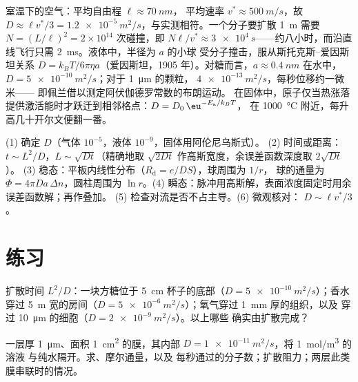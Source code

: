 \begin{example}[从分子到 $D$]\label{ex:b2:particle-diffusion:kinetic}
室温下的空气：平均自由程 $\ell \approx \qty{70}{nm}$，
平均速率 $v^* \approx \qty{500}{m/s}$，故 $D \approx \ell v^*/3 =
\qty{1.2e-5}{m^2/s}$，与实测相符。一个分子要扩散 \qty{1}{m}
需要 $N = (L/\ell)^2 = 2 \times 10^{14}$ 次碰撞，即 $N\ell/v^*
\approx \qty{3e4}{s}$——约八小时，而沿直线飞行只需
\qty{2}{ms}。液体中，半径为 $a$ 的小球
受分子撞击，服从斯托克斯–爱因斯坦关系 $D =
k_BT/6\pi\eta a$（爱因斯坦，1905 年）。对糖而言，$a \approx \qty{0.4}{nm}$
在水中，$D = \qty{5e-10}{m^2/s}$；对于 \qty{1}{\micro m} 的颗粒，
$\qty{4e-13}{m^2/s}$，每秒位移约一微米——
即佩兰借以测定阿伏伽德罗常数的布朗运动。
在固体中，原子仅当热涨落
提供激活能时才跃迁到相邻格点：$D = D_0\,\eu^{-E_{\text{a}}/k_BT}$，
在 \qty{1000}{\celsius} 附近，每升高几十开尔文便翻一番。
\end{example}

\begin{method}[扩散估算]\label{meth:b2:particle-diffusion:method}
(1) 确定 $D$（气体 $10^{-5}$，液体 $10^{-9}$，固体用阿伦尼乌斯式）。
(2) 时间或距离：$t \sim L^2/D$，$L \sim \sqrt{Dt}$（精确地取
$\sqrt{2Dt}$ 作高斯宽度，余误差函数深度取 $2\sqrt{Dt}$）。
(3) 稳态：平板内线性分布（$R_{\text{d}} = e/DS$），球周围为 $1/r$，
球的通量为 $\Phi = 4\pi D a\,\Delta n$，圆柱周围为 $\ln r$。(4)
瞬态：脉冲用高斯解，表面浓度固定时用余误差函数解；再作叠加。
(5) 检查对流是否不占主导。(6) 微观核对：
$D \sim \ell v^*/3$。
\end{method}

\section{练习}

\begin{exercise}[$\star$]\label{exo:b2:particle-diffusion:1}
扩散时间 $L^2/D$：一块方糖位于 \qty{5}{cm}
杯子的底部（$D = \qty{5e-10}{m^2/s}$）；香水穿过 \qty{5}{m} 宽的房间（$D =
\qty{5e-6}{m^2/s}$）；氧气穿过 \qty{1}{mm} 厚的组织，以及
穿过 \qty{10}{\micro m} 的细胞（$D = \qty{2e-9}{m^2/s}$）。以上哪些
确实由扩散完成？
\end{exercise}

\begin{exercise}[$\star$]\label{exo:b2:particle-diffusion:2}
一层厚 \qty{1}{\micro m}、面积 \qty{1}{cm^2} 的膜，其内部 $D =
\qty{1e-11}{m^2/s}$，将 \qty{1}{mol/m^3} 的溶液
与纯水隔开。求、摩尔通量，以及
每秒通过的分子数；扩散阻力；两层此类膜串联时的情况。
\end{exercise}

